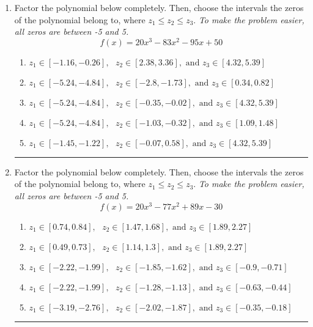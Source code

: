 \documentclass[14pt]{extbook}
\newcommand{\litem}[1]{\item#1\hspace*{-1cm}\rule{\textwidth}{0.4pt}}
\begin{document}
\begin{enumerate}
{\begin{enumerate}[label=\Alph*.]
\end{enumerate} }
\litem{
Factor the polynomial below completely. Then, choose the intervals the zeros of the polynomial belong to, where $z_1 \leq z_2 \leq z_3$. \textit{To make the problem easier, all zeros are between -5 and 5.}\[ f(x) = 20x^{3} -83 x^{2} -95 x + 50 \]\begin{enumerate}[label=\Alph*.]
\item \( z_1 \in [-1.16, -0.26], \text{   }  z_2 \in [2.38, 3.36], \text{   and   } z_3 \in [4.32, 5.39] \)
\item \( z_1 \in [-5.24, -4.84], \text{   }  z_2 \in [-2.8, -1.73], \text{   and   } z_3 \in [0.34, 0.82] \)
\item \( z_1 \in [-5.24, -4.84], \text{   }  z_2 \in [-0.35, -0.02], \text{   and   } z_3 \in [4.32, 5.39] \)
\item \( z_1 \in [-5.24, -4.84], \text{   }  z_2 \in [-1.03, -0.32], \text{   and   } z_3 \in [1.09, 1.48] \)
\item \( z_1 \in [-1.45, -1.22], \text{   }  z_2 \in [-0.07, 0.58], \text{   and   } z_3 \in [4.32, 5.39] \)

\end{enumerate} }
\litem{
Factor the polynomial below completely. Then, choose the intervals the zeros of the polynomial belong to, where $z_1 \leq z_2 \leq z_3$. \textit{To make the problem easier, all zeros are between -5 and 5.}\[ f(x) = 20x^{3} -77 x^{2} +89 x -30 \]\begin{enumerate}[label=\Alph*.]
\item \( z_1 \in [0.74, 0.84], \text{   }  z_2 \in [1.47, 1.68], \text{   and   } z_3 \in [1.89, 2.27] \)
\item \( z_1 \in [0.49, 0.73], \text{   }  z_2 \in [1.14, 1.3], \text{   and   } z_3 \in [1.89, 2.27] \)
\item \( z_1 \in [-2.22, -1.99], \text{   }  z_2 \in [-1.85, -1.62], \text{   and   } z_3 \in [-0.9, -0.71] \)
\item \( z_1 \in [-2.22, -1.99], \text{   }  z_2 \in [-1.28, -1.13], \text{   and   } z_3 \in [-0.63, -0.44] \)
\item \( z_1 \in [-3.19, -2.76], \text{   }  z_2 \in [-2.02, -1.87], \text{   and   } z_3 \in [-0.35, -0.18] \)


\end{enumerate}}
\end{enumerate}
\end{document}
